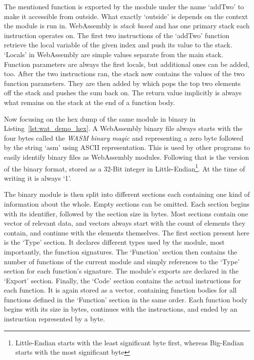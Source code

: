 The mentioned function is exported by the module under the name `addTwo' to make it accessible from outside.
What exactly `outside' is depends on the context the module is run in.
WebAssembly is \emph{stack based} and has one primary stack each instruction operates on.
The first two instructions of the `addTwo' function retrieve the local variable of the given index and push its value to the stack.
`Locals' in WebAssembly are simple values separate from the main stack.
Function parameters are always the first locals, but additional ones can be added, too.
After the two instructions ran, the stack now contains the values of the two function parameters.
They are then added by  which pops the top two elements off the stack and pushes the sum back on.
The return value implicitly is always what remains on the stack at the end of a function body.

Now focusing on the hex dump of the same module in binary in Listing~\ref{lst:wat_demo_hex}.
A WebAssembly binary file always starts with the four bytes  called the \emph{WASM binary magic} and representing a zero byte followed by the string `asm' using ASCII representation.
This is used by other programs to easily identify binary files as WebAssembly modules.
Following that is the version of the binary format, stored as a 32-Bit integer in Little-Endian\footnote{Little-Endian starts with the least significant byte first, whereas Big-Endian starts with the most significant byte}.
At the time of writing it is always `1'.

The binary module is then split into different sections each containing one kind of information about the whole.
Empty sections can be omitted.
Each section begins with its identifier, followed by the section size in bytes.
Most sections contain one vector of relevant data, and vectors always start with the count of elements they contain, and continue with the elements themselves.
The first section present here is the `Type' section.
It declares different types used by the module, most importantly, the function signatures.
The `Function' section then contains the number of functions of the current module and simply references to the `Type' section for each function's signature.
The module's exports are declared in the `Export' section.
Finally, the `Code' section contains the actual instructions for each function.
It is again stored as a vector, containing function bodies for all functions defined in the `Function' section in the same order.
Each function body begins with its size in bytes, continues with the instructions, and ended by an  instruction represented by a  byte.


